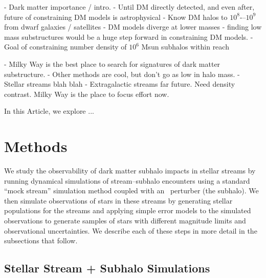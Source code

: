 - Dark matter importance / intro.
- Until DM directly detected, and even after, future of constraining DM models is astrophysical
- Know DM halos to $10^8$-–$10^9$ from dwarf galaxies / satellites
- DM models diverge at lower masses - finding low mass substructures would be a huge step forward in constraining DM models.
- Goal of constraining number density of $10^6$ Msun subhalos within reach

- Milky Way is the best place to search for signatures of dark matter substructure.
- Other methods are cool, but don't go as low in halo mass.
- Stellar streams blah blah
- Extragalactic streams far future. Need density contrast. Milky Way is the place to focus effort now.

In this Article, we explore ...

\section{Methods} \label{sec:methods}

We study the observability of dark matter subhalo impacts in stellar streams by running
dynamical simulations of stream--subhalo encounters using a standard ``mock stream''
simulation method coupled with an \nbody\ perturber (the subhalo).
We then simulate observations of stars in these streams by generating stellar
populations for the streams and applying simple error models to the simulated
observations to generate samples of stars with different magnitude limits and
observational uncertainties.
We describe each of these steps in more detail in the subsections that follow.

\subsection{Stellar Stream + Subhalo Simulations} \label{sec:streams}

